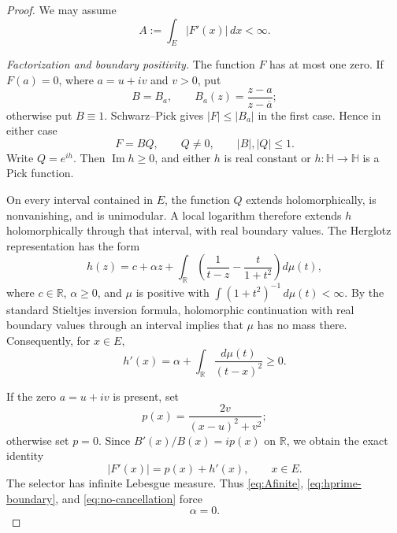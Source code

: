 \documentclass[10pt,a4paper]{amsart}
\newcommand{\Hh}{\mathbb H}
\newcommand{\R}{\mathbb R}
\begin{document}
\begin{proof}
We may assume
\begin{equation}\label{eq:Afinite}
  A:=\int_E|F'(x)|\,dx<\infty.
\end{equation}

\smallskip
\noindent\emph{Factorization and boundary positivity.}
The function $F$ has at most one zero. If $F(a)=0$, where $a=u+iv$ and
$v>0$, put
\[
  B=B_a,\qquad B_a(z)=\frac{z-a}{z-\overline a};
\]
otherwise put $B\equiv1$. Schwarz--Pick gives $|F|\le|B_a|$ in the first
case. Hence in either case
\begin{equation}\label{eq:FBQ}
  F=BQ,
  \qquad Q\ne0,
  \qquad |B|,|Q|\le1.
\end{equation}
Write $Q=e^{ih}$. Then $\operatorname{Im}h\ge0$, and either $h$ is real
constant or $h:\Hh\to\Hh$ is a Pick function.

On every interval contained in $E$, the function $Q$ extends holomorphically,
is nonvanishing, and is unimodular. A local logarithm therefore extends $h$
holomorphically through that interval, with real boundary values. The Herglotz representation \cite[Chapter~I]{Duren} has the form
\begin{equation}\label{eq:Herglotz}
  h(z)=c+\alpha z+
  \int_{\R}\left(\frac1{t-z}-\frac{t}{1+t^2}\right)d\mu(t),
\end{equation}
where $c\in\R$, $\alpha\ge0$, and $\mu$ is positive with
$\int(1+t^2)^{-1}\,d\mu(t)<\infty$. By the standard Stieltjes inversion
formula, holomorphic continuation with real boundary values through an
interval implies that $\mu$ has no mass there. Consequently, for $x\in E$,
\begin{equation}\label{eq:hprime-boundary}
  h'(x)=\alpha+\int_{\R}\frac{d\mu(t)}{(t-x)^2}\ge0.
\end{equation}

If the zero $a=u+iv$ is present, set
\[
  p(x)=\frac{2v}{(x-u)^2+v^2};
\]
otherwise set $p=0$. Since $B'(x)/B(x)=ip(x)$ on $\R$, we obtain the exact
identity
\begin{equation}\label{eq:no-cancellation}
  |F'(x)|=p(x)+h'(x),
  \qquad x\in E.
\end{equation}
The selector has infinite Lebesgue measure. Thus \eqref{eq:Afinite},
\eqref{eq:hprime-boundary}, and \eqref{eq:no-cancellation} force
\begin{equation}\label{eq:alpha-zero}
  \alpha=0.
\end{equation}


\end{proof}
\end{document}
